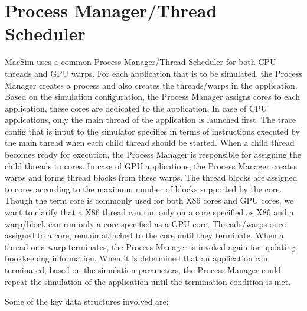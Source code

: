 
\chapter{Process Manager/Thread Scheduler}

MacSim uses a common Process Manager/Thread Scheduler for both CPU threads and
GPU warps. For each application that is to be simulated, the Process Manager
creates a process and also creates the threads/warps in the application. Based
on the simulation configuration, the Process Manager assigns cores to each
application, these cores are dedicated to the application. In case of CPU
applications, only the main thread of the application is launched first. The
trace config that is input to the simulator specifies in terms of instructions
executed by the main thread when each child thread should be started. When a
child thread becomes ready for execution, the Process Manager is responsible
for assigning the child threads to cores. In case of GPU applications, the
Process Manager creates warps and forms thread blocks from these warps. The
thread blocks are assigned to cores according to the maximum number of blocks
supported by the core. Though the term core is commonly used for both X86 cores
and GPU cores, we want to clarify that a X86 thread can run only on a core
specified as X86 and a warp/block can run only a core specified as a GPU core.
Threads/warps once assigned to a core, remain attached to the core until they
terminate. When a thread or a warp terminates, the Process Manager is invoked
again for updating bookkeeping information. When it is determined that an
application can terminated, based on the simulation parameters, the Process
Manager could repeat the simulation of the application until the termination
condition is met.



Some of the key data structures involved are:

